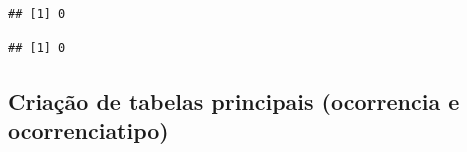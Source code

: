\documentclass[
]{article}
\newenvironment{Shaded}{\begin{snugshade}}{\end{snugshade}}
\newcommand{\AttributeTok}[1]{\textcolor[rgb]{0.77,0.63,0.00}{#1}}
\newcommand{\DecValTok}[1]{\textcolor[rgb]{0.00,0.00,0.81}{#1}}
\newcommand{\FunctionTok}[1]{\textcolor[rgb]{0.00,0.00,0.00}{#1}}
\newcommand{\NormalTok}[1]{#1}
\newcommand{\OtherTok}[1]{\textcolor[rgb]{0.56,0.35,0.01}{#1}}
\newcommand{\SpecialCharTok}[1]{\textcolor[rgb]{0.00,0.00,0.00}{#1}}
\newcommand{\StringTok}[1]{\textcolor[rgb]{0.31,0.60,0.02}{#1}}
\begin{document}
\begin{verbatim}
## [1] 0
\end{verbatim}

\begin{Shaded}
\end{Shaded}

\begin{verbatim}
## [1] 0
\end{verbatim}

\begin{Shaded}
\end{Shaded}

\hypertarget{criauxe7uxe3o-de-tabelas-principais-ocorrencia-e-ocorrenciatipo}{%
\subsection{Criação de tabelas principais (ocorrencia e
ocorrenciatipo)}\label{criauxe7uxe3o-de-tabelas-principais-ocorrencia-e-ocorrenciatipo}}
\end{document}
